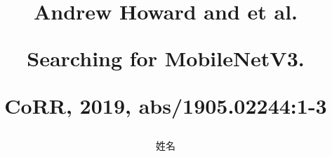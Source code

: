 \title{Andrew Howard and et al.\par
        Searching for MobileNetV3. \par
        CoRR, 2019, abs/1905.02244:1-3}
\author{姓名}
